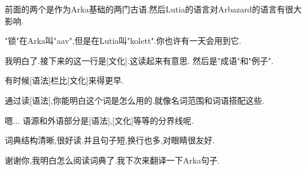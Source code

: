 前面的两个是作为Arka基础的两门古语.然后Lutia的语言对Arbazard的语言有很大影响.

"锁"在Arka叫"aav",但是在Lutia叫"kolett".你也许有一天会用到它.


我明白了.接下来的这一行是[文化].这读起来有意思.
然后是"成语"和"例子".


有时候[语法]栏比[文化]来得更早.

通过读[语法],你能明白这个词是怎么用的.就像名词范围和词语搭配这些.


嗯... 语源和外语部分是[语法],[文化]等等的分界线呢.

词典结构清晰,很好读.并且句子短,换行也多,对眼睛很友好.

谢谢你,我明白怎么阅读词典了.我下次来翻译一下Arka句子.